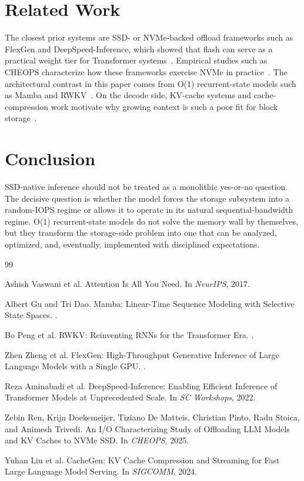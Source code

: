 \documentclass[11pt]{article}
\begin{document}
\section{Related Work}
The closest prior systems are SSD- or NVMe-backed offload frameworks such as FlexGen and DeepSpeed-Inference, which showed that flash can serve as a practical weight tier for Transformer systems~\cite{flexgen,deepspeed}. Empirical studies such as CHEOPS characterize how these frameworks exercise NVMe in practice~\cite{cheops}. The architectural contrast in this paper comes from O(1) recurrent-state models such as Mamba and RWKV~\cite{mamba,rwkv}. On the decode side, KV-cache systems and cache-compression work motivate why growing context is such a poor fit for block storage~\cite{cachegen}.

\section{Conclusion}
SSD-native inference should not be treated as a monolithic yes-or-no question. The decisive question is whether the model forces the storage subsystem into a random-IOPS regime or allows it to operate in its natural sequential-bandwidth regime. O(1) recurrent-state models do not solve the memory wall by themselves, but they transform the storage-side problem into one that can be analyzed, optimized, and, eventually, implemented with disciplined expectations.

\begin{thebibliography}{99}

Ashish Vaswani et al.
\newblock Attention Is All You Need.
\newblock In \emph{NeurIPS}, 2017.

Albert Gu and Tri Dao.
\newblock Mamba: Linear-Time Sequence Modeling with Selective State Spaces.
.

Bo Peng et al.
\newblock RWKV: Reinventing RNNs for the Transformer Era.
.

Zhen Zheng et al.
\newblock FlexGen: High-Throughput Generative Inference of Large Language Models with a Single GPU.
.

Reza Aminabadi et al.
\newblock DeepSpeed-Inference: Enabling Efficient Inference of Transformer Models at Unprecedented Scale.
\newblock In \emph{SC Workshops}, 2022.

Zebin Ren, Krijn Doekemeijer, Tiziano De Matteis, Christian Pinto, Radu Stoica, and Animesh Trivedi.
\newblock An I/O Characterizing Study of Offloading LLM Models and KV Caches to NVMe SSD.
\newblock In \emph{CHEOPS}, 2025.

Yuhan Liu et al.
\newblock CacheGen: KV Cache Compression and Streaming for Fast Large Language Model Serving.
\newblock In \emph{SIGCOMM}, 2024.

\end{thebibliography}
\end{document}
